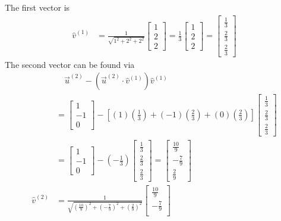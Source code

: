 \begin{solution}
The first vector is
\begin{align*}
\hat{v}^{(1)} &= \frac{1}{\sqrt{1^2+2^2+2^2}}
\begin{bmatrix}
1 \\
2 \\
2
\end{bmatrix} 
= 
\frac{1}{3}
\begin{bmatrix}
1 \\
2 \\
2
\end{bmatrix} 
=
\begin{bmatrix}
\frac{1}{3} \\
\frac{2}{3} \\
\frac{2}{3}
\end{bmatrix}
\end{align*}
The second vector can be found via
\begin{align*}
&\quad \vec{u}^{(2)} - (\vec{u}^{(2)} \cdot \hat{v}^{(1)})\hat{v}^{(1)} \\
&= 
\begin{bmatrix}
1 \\
-1 \\
0
\end{bmatrix} 
-
\left[(1)(\frac{1}{3}) + (-1)(\frac{2}{3}) + (0)(\frac{2}{3})\right]
\begin{bmatrix}
\frac{1}{3} \\
\frac{2}{3} \\
\frac{2}{3}
\end{bmatrix} \\
&= 
\begin{bmatrix}
1 \\
-1 \\
0
\end{bmatrix}
- (-\frac{1}{3})
\begin{bmatrix}
\frac{1}{3} \\
\frac{2}{3} \\
\frac{2}{3}
\end{bmatrix}
=
\begin{bmatrix}
\frac{10}{9} \\
-\frac{7}{9} \\
\frac{2}{9}
\end{bmatrix} \\
\hat{v}^{(2)} &= \frac{1}{\sqrt{(\frac{10}{9})^2+(-\frac{7}{9})^2+(\frac{2}{9})^2}}
\begin{bmatrix}
\frac{10}{9} \\
-\frac{7}{9} \\

\end{bmatrix}
\end{align*}
\end{solution}
